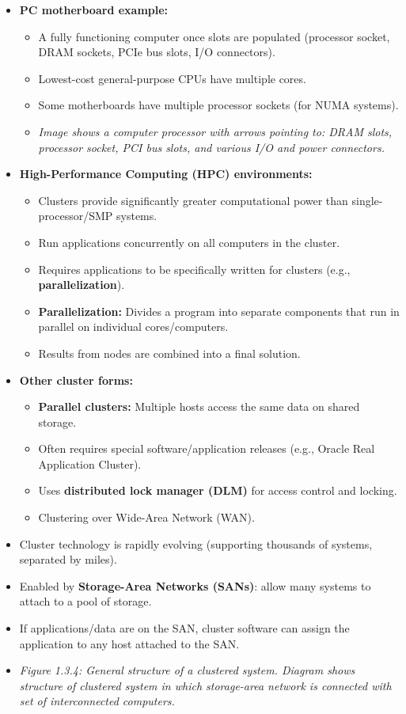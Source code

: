 \documentclass{article}
\begin{document}
\begin{itemize}
\begin{itemize}
    \end{itemize}
    \item \textbf{PC motherboard example:}
    \begin{itemize}
        \item A fully functioning computer once slots are populated (processor socket, DRAM sockets, PCIe bus slots, I/O connectors).
        \item Lowest-cost general-purpose CPUs have multiple cores.
        \item Some motherboards have multiple processor sockets (for NUMA systems).
        \item \textit{Image shows a computer processor with arrows pointing to: DRAM slots, processor socket, PCI bus slots, and various I/O and power connectors.}
    \end{itemize}
    \item \textbf{High-Performance Computing (HPC) environments:}
    \begin{itemize}
        \item Clusters provide significantly greater computational power than single-processor/SMP systems.
        \item Run applications concurrently on all computers in the cluster.
        \item Requires applications to be specifically written for clusters (e.g., \textbf{parallelization}).
        \item \textbf{Parallelization:} Divides a program into separate components that run in parallel on individual cores/computers.
        \item Results from nodes are combined into a final solution.
    \end{itemize}
    \item \textbf{Other cluster forms:}
    \begin{itemize}
        \item \textbf{Parallel clusters:} Multiple hosts access the same data on shared storage.
        \item Often requires special software/application releases (e.g., Oracle Real Application Cluster).
        \item Uses \textbf{distributed lock manager (DLM)} for access control and locking.
        \item Clustering over Wide-Area Network (WAN).
    \end{itemize}
    \item Cluster technology is rapidly evolving (supporting thousands of systems, separated by miles).
    \item Enabled by \textbf{Storage-Area Networks (SANs)}: allow many systems to attach to a pool of storage.
    \item If applications/data are on the SAN, cluster software can assign the application to any host attached to the SAN.
    \item \textit{Figure 1.3.4: General structure of a clustered system. Diagram shows structure of clustered system in which storage-area network is connected with set of interconnected computers.}
\end{itemize}
\end{document}
